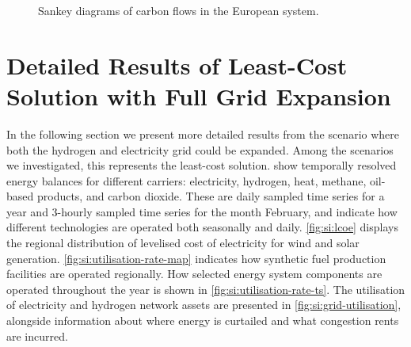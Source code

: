 \begin{figure}
    \caption{Sankey diagrams of carbon flows in the European system.}
    \label{fig:si:carbon-sankey}
\end{figure}


\section{Detailed Results of Least-Cost Solution with Full Grid Expansion}
\label{sec:si:detailed}

In the following section we present more detailed results from the scenario
where both the hydrogen and electricity grid could be expanded. Among the
scenarios we investigated, this represents the least-cost solution.
 show temporally resolved energy
balances for different carriers: electricity, hydrogen, heat, methane, oil-based
products, and carbon dioxide. These are daily sampled time series for a year and
3-hourly sampled time series for the month February, and indicate how different
technologies are operated both seasonally and daily. \cref{fig:si:lcoe} displays
the regional distribution of levelised cost of electricity for wind and solar
generation. \cref{fig:si:utilisation-rate-map} indicates how synthetic fuel
production facilities are operated regionally. How selected energy system
components are operated throughout the year is shown in
\cref{fig:si:utilisation-rate-ts}. The utilisation of electricity and hydrogen
network assets are presented in \cref{fig:si:grid-utilisation}, alongside
information about where energy is curtailed and what congestion rents are
incurred.

